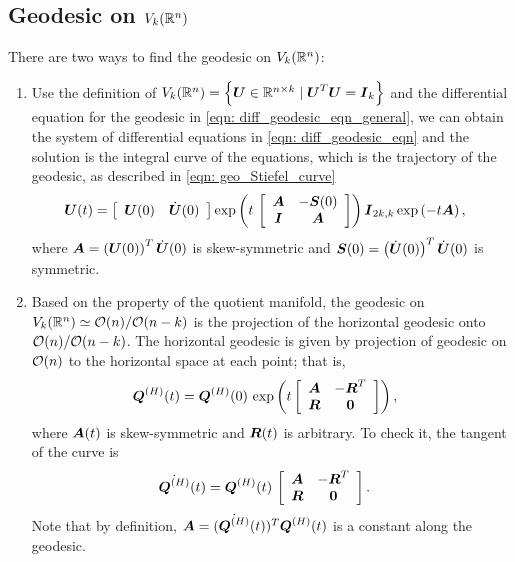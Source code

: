 \documentclass[11pt]{article}
\begin{document}
\subsection{Geodesic on $V_{k}({\mathbb R}^{n})$}
There are two ways to find the geodesic on $V_{k}({\mathbb R}^{n})$: 
\begin{enumerate}
\item Use the definition of $V_{k}({\mathbb R}^{n}) = \left\{\boldsymbol{U}\in {\mathbb R}^{n\times k}\;|\;  \boldsymbol{U}^{T}\boldsymbol{U}= \boldsymbol{I}_{k}\right\}$ and the differential equation for the geodesic in \eqref{eqn: diff_geodesic_eqn_general}, we can obtain the system of differential equations in \eqref{eqn: diff_geodesic_eqn} and the solution is the integral curve of the equations, which is the trajectory of the geodesic, as described in \eqref{eqn: geo_Stiefel_curve}
\begin{align*}
\boldsymbol{U}(t) &=  \left[\begin{array}{cc}
\boldsymbol{U}(0)& \dot{\boldsymbol{U}}(0)
\end{array} \right]\exp\left(t\,\left[\begin{array}{cc}
\boldsymbol{A} & -\boldsymbol{S}(0) \\ 
\boldsymbol{I} & \boldsymbol{A}
\end{array} \right] \right)\boldsymbol{I}_{2k,k}\exp\left(-t\boldsymbol{A}\right),
\end{align*}
where $\boldsymbol{A} = \left(\boldsymbol{U}(0)\right)^{T}\dot{\boldsymbol{U}}(0)$ is skew-symmetric and $\boldsymbol{S}(0) = \left(\dot{\boldsymbol{U}}(0)\right)^{T}\dot{\boldsymbol{U}}(0)$ is symmetric.  \citep{edelman1998geometry}\\[15pt]

\item Based on the property of the quotient manifold, the geodesic on $V_{k}({\mathbb R}^{n}) \simeq {\mathcal O}(n)/{\mathcal O}(n-k)$ is the projection of the horizontal geodesic onto ${\mathcal O}(n)/{\mathcal O}(n-k)$. The horizontal geodesic is given by projection of geodesic on ${\mathcal O}(n)$ to the horizontal space at each point; that is,
\begin{align*}
\boldsymbol{Q}^{(H)}(t) &= \boldsymbol{Q}^{(H)}(0)\,\exp\left(t\left[\begin{array}{cc}
\boldsymbol{A} & -\boldsymbol{R}^{T} \\ 
\boldsymbol{R}& \boldsymbol{0}
\end{array} \right]\right), 
\end{align*}
where $\boldsymbol{A}(t)$ is skew-symmetric and $\boldsymbol{R}(t)$ is arbitrary. To check it, the tangent of the curve is 
\begin{align*}
\dot{\boldsymbol{Q}^{(H)}}(t) &= \boldsymbol{Q}^{(H)}(t)\,\left[\begin{array}{cc}
\boldsymbol{A} & -\boldsymbol{R}^{T} \\ 
\boldsymbol{R}& \boldsymbol{0}
\end{array} \right].
\end{align*}
Note that by definition, $\boldsymbol{A} =(\dot{\boldsymbol{Q}^{(H)}}(t))^{T}\boldsymbol{Q}^{(H)}(t) $ is a constant along the geodesic. 


\end{enumerate}
\end{document}
